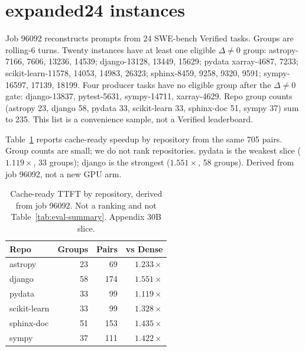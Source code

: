 \begin{algorithm}[ht]
\SetAlFnt{\footnotesize}
\DontPrintSemicolon
{}
\caption{Compile next-island prefetch hints (M3)}
\label{algo:prefetch-hints}
\end{algorithm}

\section{expanded24 instances}
\label{app:dataset}

Job 96092 reconstructs prompts from 24 SWE-bench Verified tasks. Groups
are rolling-6 turns. Twenty instances have at least one eligible
$\Delta\neq 0$ group: astropy-7166, 7606, 13236, 14539; django-13128,
13449, 15629; pydata xarray-4687, 7233; scikit-learn-11578, 14053,
14983, 26323; sphinx-8459, 9258, 9320, 9591; sympy-16597, 17139, 18199.
Four producer tasks have no eligible group after the $\Delta\neq 0$
gate: django-13837, pytest-5631, sympy-14711, xarray-4629. Repo group
counts (astropy 23, django 58, pydata 33, scikit-learn 33, sphinx-doc
51, sympy 37) sum to 235. This list is a convenience sample, not a
Verified leaderboard.

Table~\ref{tab:repo-slice} reports cache-ready speedup by repository
from the same 705 pairs. Group counts are small; we do not rank
repositories. pydata is the weakest slice ($1.119\times$, 33 groups);
django is the strongest ($1.551\times$, 58 groups). Derived from job
96092, not a new GPU arm.

\begin{table}[t]
\centering
\small
\caption{Cache-ready TTFT by repository, derived from job 96092. Not a
ranking and not Table~\ref{tab:eval-summary}. Appendix 30B slice.}
\label{tab:repo-slice}
\begin{tabular}{lrrr}
\toprule
\textbf{Repo} & \textbf{Groups} & \textbf{Pairs} & \textbf{vs Dense} \\
\midrule
astropy & 23 & 69 & $1.233\times$ \\
django & 58 & 174 & $1.551\times$ \\
pydata & 33 & 99 & $1.119\times$ \\
scikit-learn & 33 & 99 & $1.328\times$ \\
sphinx-doc & 51 & 153 & $1.435\times$ \\
sympy & 37 & 111 & $1.422\times$ \\
\bottomrule
\end{tabular}
\end{table}

